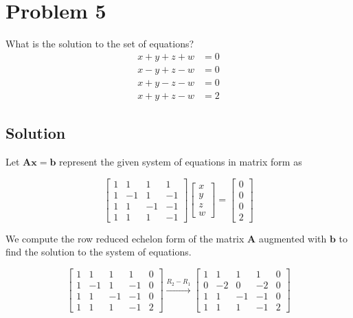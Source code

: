 \section*{Problem 5}

What is the solution to the set of equations?
\begin{align*}
    x + y + z + w & = 0 \\
    x - y + z - w & = 0 \\
    x + y - z - w & = 0 \\
    x + y + z - w & = 2
\end{align*}

\subsection*{Solution}

Let \( \mathbf{A}\mathbf{x} = \mathbf{b} \) represent the given system of equations in matrix form as

\begin{equation*}
    \begin{bmatrix}
        1 & 1  & 1  & 1  \\
        1 & -1 & 1  & -1 \\
        1 & 1  & -1 & -1 \\
        1 & 1  & 1  & -1
    \end{bmatrix}
    \begin{bmatrix}
        x \\
        y \\
        z \\
        w
    \end{bmatrix}
    =
    \begin{bmatrix}
        0 \\
        0 \\
        0 \\
        2
    \end{bmatrix}
\end{equation*}

We compute the row reduced echelon form of the matrix \( \mathbf{A} \) augmented with \( \mathbf{b} \) to find the solution to the system of equations.

\begin{equation*}
    \begin{bmatrix}
        1 & 1  & 1  & 1  & 0 \\
        1 & -1 & 1  & -1 & 0 \\
        1 & 1  & -1 & -1 & 0 \\
        1 & 1  & 1  & -1 & 2
    \end{bmatrix}
    \xrightarrow{R_2 - R_1}
    \begin{bmatrix}
        1 & 1  & 1  & 1  & 0 \\
        0 & -2 & 0  & -2 & 0 \\
        1 & 1  & -1 & -1 & 0 \\
        1 & 1  & 1  & -1 & 2
    \end{bmatrix}
\end{equation*}

